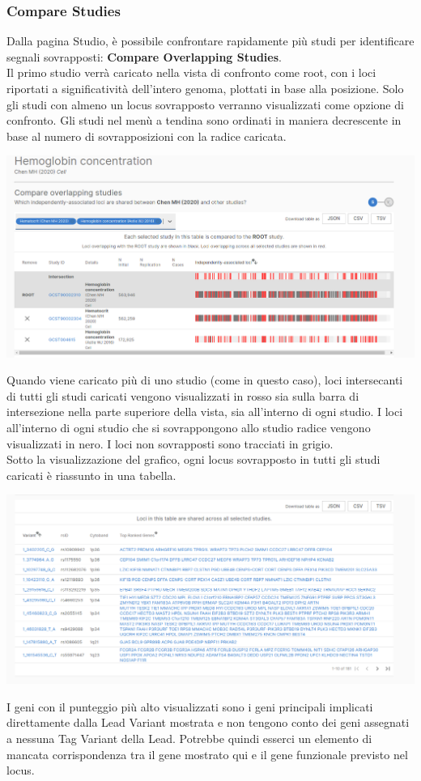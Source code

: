 \documentclass{article}
\begin{document}
\subsubsection{Compare Studies}
Dalla pagina Studio, è possibile confrontare rapidamente più studi per identificare segnali sovrapposti: \textbf{Compare Overlapping Studies}.\\
Il primo studio verrà caricato nella vista di confronto come root, con i loci riportati a significatività dell'intero genoma, plottati in base alla posizione. Solo gli studi con almeno un locus sovrapposto verranno visualizzati come opzione di confronto. Gli studi nel menù a tendina sono ordinati in maniera decrescente in base al numero di sovrapposizioni con la radice caricata.
\begin{center}
    \includegraphics[width=1\textwidth]{figures/7-Compare Studies.png}
\end{center}
Quando viene caricato più di uno studio (come in questo caso), loci intersecanti di tutti gli studi caricati vengono visualizzati in rosso sia sulla barra di intersezione nella parte superiore della vista, sia all'interno di ogni studio. I loci all'interno di ogni studio che si sovrappongono allo studio radice vengono visualizzati in nero. I loci non sovrapposti sono tracciati in grigio.\\
Sotto la visualizzazione del grafico, ogni locus sovrapposto in tutti gli studi caricati è riassunto in una tabella.
\begin{center}
    \includegraphics[width=1\textwidth]{figures/8-Compare Studies.png}
\end{center}
I geni con il punteggio più alto visualizzati sono i geni principali implicati direttamente dalla Lead Variant mostrata e non tengono conto dei geni assegnati a nessuna Tag Variant della Lead. Potrebbe quindi esserci un elemento di mancata corrispondenza tra il gene mostrato qui e il gene funzionale previsto nel locus.
\end{document}
